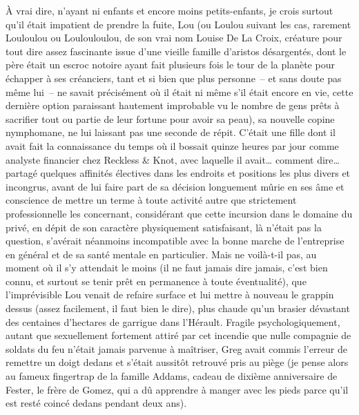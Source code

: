 À vrai dire, n’ayant ni enfants et encore moins petits-enfants, je crois surtout qu’il était impatient de prendre la fuite, Lou (ou Loulou suivant les cas, rarement Louloulou ou Loulouloulou, de son vrai nom Louise De La Croix, créature pour tout dire assez fascinante issue d’une vieille famille d’aristos désargentés, dont le père était un escroc notoire ayant fait plusieurs fois le tour de la planète pour échapper à ses créanciers, tant et si bien que plus personne~-- et sans doute pas même lui~-- ne savait précisément où il était ni même s’il était encore en vie, cette dernière option paraissant hautement improbable vu le nombre de gens prêts à sacrifier tout ou partie de leur fortune pour avoir sa peau), sa nouvelle copine nymphomane, ne lui laissant pas une seconde de répit. C’était une fille dont il avait fait la connaissance du temps où il bossait quinze heures par jour comme analyste financier chez Reckless \& Knot, avec laquelle il avait… comment dire… partagé quelques affinités électives dans les endroits et positions les plus divers et incongrus, avant de lui faire part de sa décision longuement mûrie en ses âme et conscience de mettre un terme à toute activité autre que strictement professionnelle les concernant, considérant que cette incursion dans le domaine du privé, en dépit de son caractère physiquement satisfaisant, là n’était pas la question, s’avérait néanmoins incompatible avec la bonne marche de l’entreprise en général et de sa santé mentale en particulier. Mais ne voilà-t-il pas, au moment où il s’y attendait le moins (il ne faut jamais dire jamais, c’est bien connu, et surtout se tenir prêt en permanence à toute éventualité), que l’imprévisible Lou venait de refaire surface et lui mettre à nouveau le grappin dessus (assez facilement, il faut bien le dire), plus chaude qu’un brasier dévastant des centaines d’hectares de garrigue dans l’Hérault. Fragile psychologiquement, autant que sexuellement fortement attiré par cet incendie que nulle compagnie de soldats du feu n’était jamais parvenue à maîtriser, Greg avait commis l’erreur de remettre un doigt dedans et s’était aussitôt retrouvé pris au piège (je pense alors au fameux fingertrap de la famille Addams, cadeau de dixième anniversaire de Fester, le frère de Gomez, qui a dû apprendre à manger avec les pieds parce qu’il est resté coincé dedans pendant deux ans).


